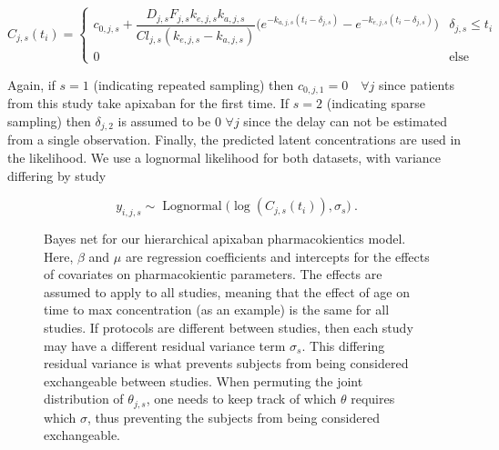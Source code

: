 $$ C_{j, s}(t_i) =  \begin{cases} c_{0, j, s} + \dfrac{D_{j, s} F_{j, s} k_{e, j, s} k_{a, j, s}}{Cl_{j, s}(k_{e, j, s} - k_{a, j, s})} \Bigg( e^{-k_{a, j, s}(t_i - \delta_{j, s})} - e^{-k_{e, j, s}(t_i - \delta_{j, s})} \Bigg)  & \delta_{j, s} \leq t_i \\ 0 & \mbox{else} \end{cases}$$

Again, if $s=1$ (indicating repeated sampling) then $c_{0, j, 1} = 0 \quad \forall j$ since patients from this study take apixaban for the first time.  If $s=2$ (indicating sparse sampling) then $\delta_{j, 2}$ is assumed to be 0 $\forall j$ since the delay can not be estimated from a single observation.  Finally, the predicted latent concentrations are used in the likelihood.  We use a lognormal likelihood for both datasets, with variance differing by study

$$ y_{i,j,s} \sim \operatorname{Lognormal}\Big( \log(C_{j, s}(t_i)), \sigma_s \Big)  \>.$$


\begin{figure}[t!]
	
	\centering
	\caption{Bayes net for our hierarchical apixaban pharmacokientics model.  Here, $\beta$ and $\mu$ are regression coefficients and intercepts for the effects of covariates on pharmacokientic parameters.  The effects are assumed to apply to all studies, meaning that the effect of age on time to max concentration (as an example) is the same for all studies.  If protocols are different between studies, then each study may have a different residual variance term $\sigma_s$.  This differing residual variance is what prevents subjects from being considered exchangeable between studies.  When permuting the joint distribution of $\theta_{j, s}$, one needs to keep track of which $\theta$ requires which $\sigma$, thus preventing the subjects from being considered exchangeable.}
\end{figure}

